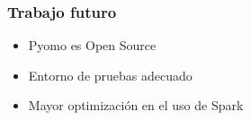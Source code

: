 \documentclass{beamer}
\begin{document}
\begin{frame}{}
    \frametitle{Trabajo futuro}
    \begin{itemize}
        \item Pyomo es Open Source \pause
        \item Entorno de pruebas adecuado
        \item Mayor optimización en el uso de Spark
    \end{itemize}
\end{frame}

\begin{frame}[plain]
    \titlepage
\end{frame}
\end{document}
